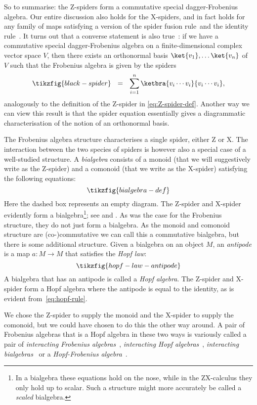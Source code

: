 \documentclass[a4paper,onecolumn,superscriptaddress,11pt,%
				unpublished,%
				allowfontchageintitle,%
				]{quantumarticle}
\begin{document}
So to summarise: the Z-spiders form a commutative special dagger-Frobenius algebra. Our entire discussion also holds for the X-spiders, and in fact holds for any family of maps satisfying a version of the spider fusion rule~\SpiderRule and the identity rule~\IdRule. It turns out that a converse statement is also true~\cite{coecke2013new}: if we have a commutative special dagger-Frobenius algebra on a finite-dimensional complex vector space $V$, then there exists an orthonormal basis $\ket{v_1},\ldots\ket{v_n}$ of~$V$ such that the Frobenius algebra is given by the spiders
\begin{equation}
\tikzfig{black-spider}\ \ =\ \ \sum_{i=1}^n\ketbra{v_i\cdots v_i}{v_i\cdots v_i},
\end{equation}
analogously to the definition of the Z-spider in \eqref{eq:Z-spider-def}.
Another way we can view this result is that the spider equation \SpiderRule essentially gives a diagrammatic characterisation of the notion of an orthonormal basis.

The Frobenius algebra structure characterises a single spider, either Z or X. The interaction between the two species of spiders is however also a special case of a well-studied structure.
A \emph{bialgebra} consists of a monoid (that we will suggestively write as the Z-spider) and a comonoid (that we write as the X-spider) satisfying the following equations:
\begin{equation}
	\tikzfig{bialgebra-def}
\end{equation}
Here the dashed box represents an empty diagram. The Z-spider and X-spider evidently form a bialgebra\footnote{In a bialgebra these equations hold on the nose, while in the ZX-calculus they only hold up to scalar. Such a structure might more accurately be called a \emph{scaled} bialgebra.}; see \CopyRule and \BialgRule.
As was the case for the Frobenius structure, they do not just form a bialgebra. As the monoid and comonoid structure are (co-)commutative we can call this a commutative bialgebra, but there is some additional structure.
Given a bialgebra on an object $M$, an \emph{antipode} is a map $a:M\rightarrow M$ that satisfies the \emph{Hopf law}:
\begin{equation}
	\tikzfig{hopf-law-antipode}
\end{equation}
A bialgebra that has an antipode is called a \emph{Hopf algebra}. The Z-spider and X-spider form a Hopf algebra where the antipode is equal to the identity, as is evident from~\eqref{eq:hopf-rule}.

We chose the Z-spider to supply the monoid and the X-spider to supply the comonoid, but we could have chosen to do this the other way around. A pair of Frobenius algebras that is a Hopf algebra in these two ways is variously called a pair of \emph{interacting Frobenius algebras}~\cite{duncan2016interacting}, \emph{interacting Hopf algebras}~\cite{bonchi2017interacting}, \emph{interacting bialgebras}~\cite{bonchi2014interacting} or a \emph{Hopf-Frobenius algebra}~\cite{collins2019hopffrobenius}.
\end{document}
